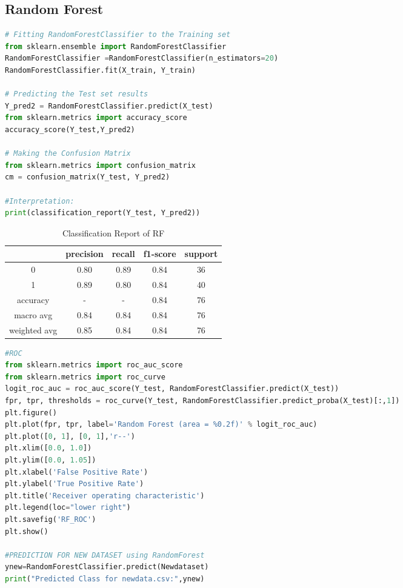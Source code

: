 \subsection{Random Forest}
\begin{lstlisting}[language=Python, label=list:python_code_ex]
# Fitting RandomForestClassifier to the Training set
from sklearn.ensemble import RandomForestClassifier
RandomForestClassifier =RandomForestClassifier(n_estimators=20)
RandomForestClassifier.fit(X_train, Y_train)

# Predicting the Test set results
Y_pred2 = RandomForestClassifier.predict(X_test)
from sklearn.metrics import accuracy_score
accuracy_score(Y_test,Y_pred2)

# Making the Confusion Matrix
from sklearn.metrics import confusion_matrix
cm = confusion_matrix(Y_test, Y_pred2)

#Interpretation:
print(classification_report(Y_test, Y_pred2))
\end{lstlisting}

\begin{table}[h!]
    \centering
    \caption{Classification Report of RF}
    \label{tab:_ex_tab}
    \begin{tabular}{ccccc}     
        \toprule
            &  precision & recall & f1-score & support \\
        \midrule
        0 & 0.80 & 0.89 & 0.84 & 36 \\
        1 & 0.89 & 0.80 & 0.84 & 40 \\

        accuracy & - & - & 0.84 & 76 \\
        macro avg & 0.84 & 0.84 & 0.84 & 76 \\
        weighted avg & 0.85 & 0.84 & 0.84 & 76 \\
        \bottomrule
    \end{tabular}
\end{table}

\clearpage  %

\begin{lstlisting}[language=Python, label=list:python_code_ex]
#ROC
from sklearn.metrics import roc_auc_score
from sklearn.metrics import roc_curve
logit_roc_auc = roc_auc_score(Y_test, RandomForestClassifier.predict(X_test))
fpr, tpr, thresholds = roc_curve(Y_test, RandomForestClassifier.predict_proba(X_test)[:,1])
plt.figure()
plt.plot(fpr, tpr, label='Random Forest (area = %0.2f)' % logit_roc_auc)
plt.plot([0, 1], [0, 1],'r--')
plt.xlim([0.0, 1.0])
plt.ylim([0.0, 1.05])
plt.xlabel('False Positive Rate')
plt.ylabel('True Positive Rate')
plt.title('Receiver operating characteristic')
plt.legend(loc="lower right")
plt.savefig('RF_ROC')
plt.show()

#PREDICTION FOR NEW DATASET using RandomForest
ynew=RandomForestClassifier.predict(Newdataset)
print("Predicted Class for newdata.csv:",ynew)
\end{lstlisting}

